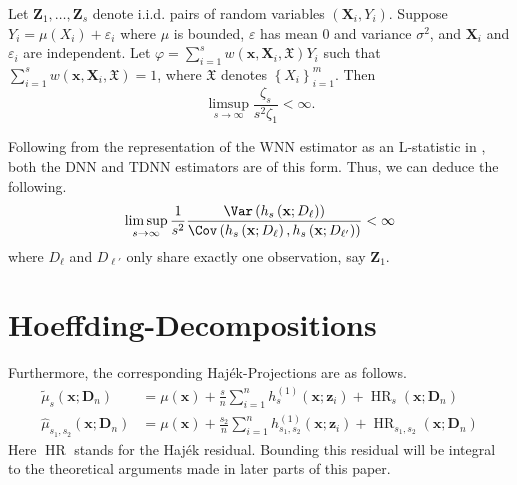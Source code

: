 \begin{thm}
	Let $\mathbf{Z}_1, \ldots, \mathbf{Z}_s$ denote i.i.d. pairs of random variables $\left(\mathbf{X}_i, Y_i\right)$.
	Suppose $Y_i=\mu\left(X_i\right)+\varepsilon_i$ where $\mu$ is bounded, $\varepsilon$ has mean 0 and variance $\sigma^2$, and $\mathbf{X}_i$ and $\varepsilon_i$ are independent.
	Let $\varphi=\sum_{i=1}^s w(\mathbf{x}, \mathbf{X}_i, \mathfrak{X}) Y_i$ such that $\sum_{i=1}^s w(\mathbf{x}, \mathbf{X}_i, \mathfrak{X})=1$, where $\mathfrak{X}$ denotes $\left\{X_i\right\}_{i=1}^m$.
	Then
	\begin{equation}
		\limsup _{s \rightarrow \infty} \frac{\zeta_s}{s^2 \zeta_1}
		< \infty.
	\end{equation}
\end{thm}

Following from the representation of the WNN estimator as an L-statistic in \citet{steele_exact_2009}, both the DNN and TDNN estimators are of this form.
Thus, we can deduce the following.
\begin{equation}
	\limsup _{s \rightarrow \infty} \frac{1}{s^2} \frac{\Var\left(h_{s}\left(\mathbf{x}; D_{\ell}\right)\right)}{\Cov\left(h_s\left(\mathbf{x}; D_{\ell}\right), h_s\left(\mathbf{x}; D_{\ell'}\right)\right)}
	< \infty
\end{equation}
where $D_{\ell}$ and $D_{\ell'}$ only share exactly one observation, say $\mathbf{Z}_1$.

\section{Hoeffding-Decompositions}

Furthermore, the corresponding Haj\'ek-Projections are as follows.
\begin{equation}\label{eq:Hajek_projection}
	\begin{aligned}
		\tilde{\mu}_{s}\left(\mathbf{x}; \mathbf{D}_n\right)
		 & = \mu(\mathbf{x}) + \frac{s}{n}\sum_{i = 1}^{n}h^{(1)}_{s}(\mathbf{x}; \mathbf{z}_{i})
		+ \operatorname{HR}_{s}(\mathbf{x}; \mathbf{D}_n)                                                   \\
		\hat{\mu}_{s_1, s_2}\left(\mathbf{x}; \mathbf{D}_n\right)
		 & = \mu(\mathbf{x}) + \frac{s_2}{n}\sum_{i = 1}^{n} h^{(1)}_{s_1, s_2}(\mathbf{x}; \mathbf{z}_{i})
		+ \operatorname{HR}_{s_1, s_2}(\mathbf{x}; \mathbf{D}_n)
	\end{aligned}
\end{equation}
Here $\operatorname{HR}$ stands for the Haj\'ek residual.
Bounding this residual will be integral to the theoretical arguments made in later parts of this paper.

